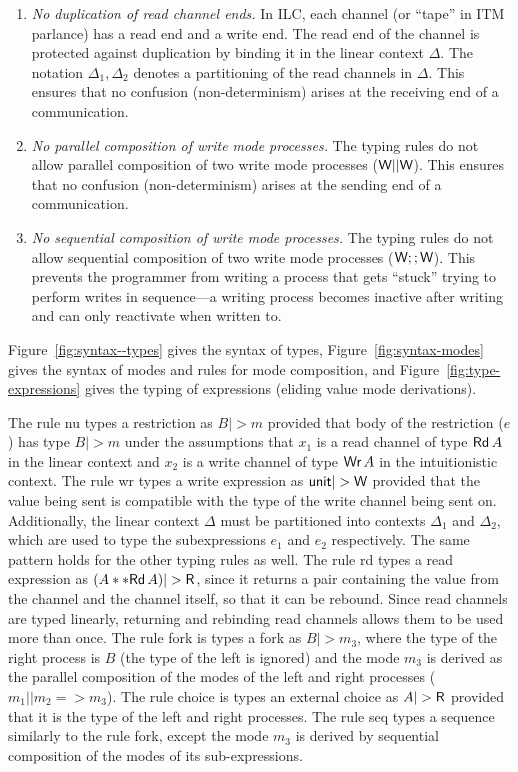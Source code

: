 \begin{enumerate}
\item \emph{No duplication of read channel ends.} In ILC, each channel (or
  ``tape'' in ITM parlance) has a read end and a write end. The read end of the
  channel is protected against duplication by binding it in the linear
  context $\Delta$. The notation $\Delta_1, \Delta_2$ denotes a partitioning of the read
  channels in $\Delta$. This ensures that no confusion (non-determinism) arises at the receiving end of
  a communication.

\item \emph{No parallel composition of write mode processes.} The typing rules
  do not allow parallel composition of two write mode processes ($\textsf{W} ||
  \textsf{W}$). This ensures that no confusion (non-determinism) arises at the sending
  end of a communication.

\item \emph{No sequential composition of write mode processes.} The typing rules
  do not allow sequential composition of two write mode processes ($\textsf{W} ;;
  \textsf{W}$). This prevents the programmer from writing a process that gets ``stuck''
  trying to perform writes in sequence---a writing process becomes inactive after
  writing and can only reactivate when written to.
\end{enumerate}

\noindent Figure~\ref{fig:syntax--types} gives the syntax of types,
Figure~\ref{fig:syntax-modes} gives the syntax of modes and rules for mode
composition, and Figure~\ref{fig:type-expressions} gives the typing of
expressions (eliding value mode derivations).

 The rule nu types a restriction as
$B |> m$ provided that body of the restriction ($e$) has type $B |> m$ under the
assumptions that $x_1$ is a read channel of type $\textsf{Rd}\,A$ in the linear
context and $x_2$ is a write channel of type $\textsf{Wr}\,A$ in the intuitionistic
context. The rule wr types a write expression as $\tyUnit |> \Wm$ provided that
the value being sent is compatible with the type of the write channel being sent
on. Additionally, the linear context $\Delta$ must be partitioned into contexts $\Delta_1$
and $\Delta_2$, which are used to type the subexpressions $e_1$ and $e_2$
respectively. The same pattern holds for the other typing rules as well. The rule rd types a read expression as $(A ** \tyRd{A}) |> \Rm$, since it
returns a pair containing the value from the channel and the channel itself, so
that it can be rebound. Since read channels are typed linearly, returning and
rebinding read channels allows them to be used more than once. The rule fork is
types a fork as $B |> m_3$, where the type of the right process is $B$ (the type
of the left is ignored) and the mode $m_3$ is derived as the parallel
composition of the modes of the left and right processes ($m_1 || m_2 =>
m_3$). The rule choice is types an external choice as $A |> \Rm$ provided that
it is the type of the left and right processes. The rule seq types a sequence
similarly to the rule fork, except the mode $m_3$ is derived by sequential
composition of the modes of its sub-expressions.

